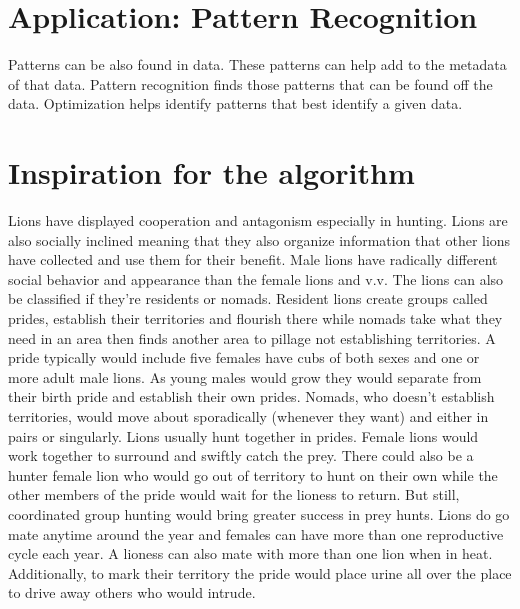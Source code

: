 \section{Application: Pattern Recognition}
Patterns can be also found in data. These patterns can help add to the metadata of that data. Pattern recognition finds those patterns that can be found off the data. Optimization helps identify patterns that best identify a given data.

\section{Inspiration for the algorithm}
Lions have displayed cooperation and antagonism especially in hunting. Lions are also socially inclined meaning that they also organize information that other lions have collected and use them for their benefit.
Male lions have radically different social behavior and appearance than the female lions and v.v.
The lions can also be classified if they're residents or nomads. Resident lions create groups called prides, establish their territories and flourish there while nomads take what they need in an area then finds another area to pillage not establishing territories.
A pride typically would include five females have cubs of both sexes and one or more adult male lions.
As young males would grow they would separate from their birth pride and establish their own prides.
Nomads, who doesn't establish territories, would move about sporadically (whenever they want) and either in pairs or singularly.
Lions usually hunt together in prides. Female lions would work together to surround and swiftly catch the prey. There could also be a hunter female lion who would go out of territory to hunt on their own while the other members of the pride would wait for the lioness to return. But still, coordinated group hunting would bring greater success in prey hunts.
Lions do go mate anytime around the year and females can have more than one reproductive cycle each year. A lioness can also mate with more than one lion when in heat.
Additionally, to mark their territory the pride would place urine all over the place to drive away others who would intrude.

